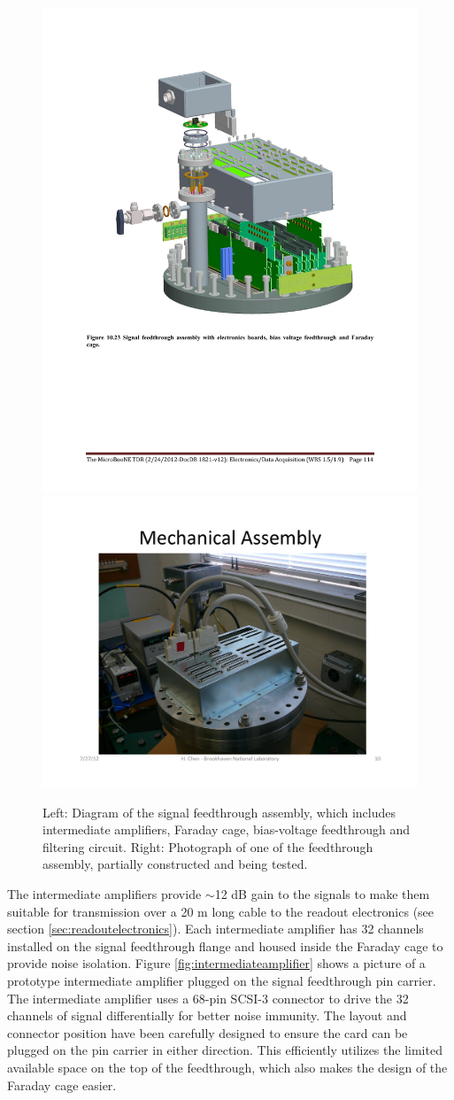 \begin{figure}[hbt]
\begin{center}
\includegraphics[width=0.4\linewidth]{figures/signal_feedthrough_assembly.pdf}
\includegraphics[width=0.4\linewidth]{figures/signal_feedthrough_assembly_photo.pdf}
\end{center}
\caption{\label{fig:feedthroughassembly}Left:  Diagram of the signal feedthrough assembly, which includes intermediate amplifiers, Faraday cage, bias-voltage feedthrough and filtering circuit.  Right: Photograph of one of the feedthrough assembly, partially constructed and being tested.}
\end{figure}

The intermediate amplifiers provide $\sim$12 dB gain to the \lartpc signals to make them suitable for transmission over a 20 m long cable to the readout electronics (see section \ref{sec:readoutelectronics}).  Each intermediate amplifier has 32 channels installed on the signal feedthrough flange and housed inside the Faraday cage to provide noise isolation. Figure \ref{fig:intermediateamplifier} shows a picture of a prototype intermediate amplifier plugged on the signal feedthrough pin carrier. The intermediate amplifier uses a 68-pin SCSI-3 connector to drive the 32 channels of signal differentially for better noise immunity. The layout and connector position have been carefully designed to ensure the card can be plugged on the pin carrier in either direction. This efficiently utilizes the limited available space on the top of the feedthrough, which also makes the design of the Faraday cage easier.

